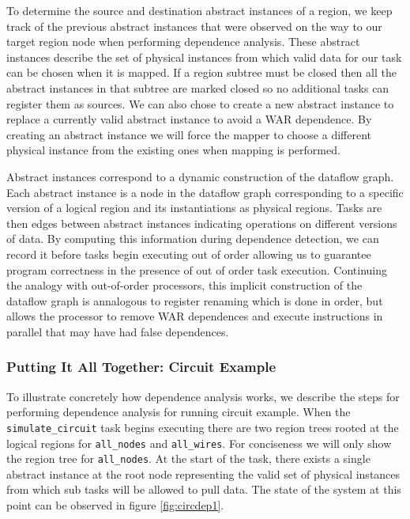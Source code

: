 To determine the source and destination abstract instances of a region, we keep track of 
the previous abstract instances that were observed on the way to our target region node
when performing dependence analysis.  These abstract instances describe the set of physical
instances from which valid data for our task can be chosen when it is mapped.  If a region
subtree must be closed then all the abstract instances in that subtree are marked closed
so no additional tasks can register them as sources.  We can also chose to create a new
abstract instance to replace a currently valid abstract instance to avoid a WAR dependence.
By creating an abstract instance we will force the mapper to choose a different physical
instance from the existing ones when mapping is performed.

Abstract instances correspond to a dynamic construction of the dataflow graph.  Each abstract
instance is a node in the dataflow graph corresponding to a specific version of a logical 
region and its instantiations as physical regions.  Tasks are then edges between abstract
instances indicating operations on different versions of data.  By computing this information
during dependence detection, we can record it before tasks begin executing out of order allowing
us to guarantee program correctness in the presence of out of order task execution.  Continuing
the analogy with out-of-order processors, this implicit construction of the dataflow graph
is annalogous to register renaming which is done in order, but allows the processor to remove
WAR dependences and execute instructions in parallel that may have had false dependences.

\subsubsection{Putting It All Together: Circuit Example}
\label{subsec:cirdependence}
To illustrate concretely how dependence analysis works, we describe the steps for
performing dependence analysis for running circuit example.  When the {\tt simulate\_circuit}
task begins executing there are two region trees rooted at the logical
regions for {\tt all\_nodes} and {\tt all\_wires}.  For conciseness we will only
show the region tree for {\tt all\_nodes}.  At the start of the task, there exists
a single abstract instance at the root node representing the valid set of physical
instances from which sub tasks will be allowed to pull data.  The state of the
system at this point can be observed in figure \ref{fig:circdep1}.


